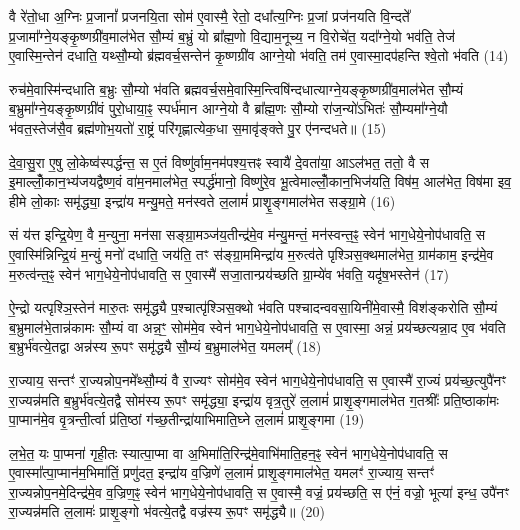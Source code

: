 वै रे॑तो॒धा अ॒ग्निः प्र॒जानां᳚ प्रजनयि॒ता सोम॑ ए॒वास्मै॒ रेतो॒ दधा᳚त्य॒ग्निः प्र॒जां प्रज॑नयति वि॒न्दते᳚ प्र॒जामा᳚ग्ने॒यङ्कृ॒ष्ण\-ग्री॑व॒माल॑भेत सौ॒म्यं ब॒भ्रुं यो ब्रा᳚ह्म॒णो वि॒द्याम॒नूच्य॒ न वि॒रोचे॑त॒ यदा᳚ग्ने॒यो भव॑ति॒ तेज॑ ए॒वास्मि॒न्तेन॑ दधाति॒ यथ्सौ॒म्यो ब्र॑ह्मवर्च॒सन्तेन॑ कृ॒ष्णग्री॑व आग्ने॒यो भ॑वति॒ तम॑ ए॒वास्मा॒दप॑हन्ति श्वे॒तो भ॑वति (14)

रुच॑मे॒वास्मि॑न्दधाति ब॒भ्रुः सौ॒म्यो भ॑वति ब्रह्मवर्च॒समे॒वास्मि॒न्त्विषि॑न्दधात्याग्ने॒यङ्कृ॒ष्णग्री॑व॒माल॑भेत सौ॒म्यं ब॒भ्रुमा᳚ग्ने॒यङ्कृ॒ष्णग्री॑वं पुरो॒धाया॒ꣴ॒ स्पर्ध॑मान आग्ने॒यो वै ब्रा᳚ह्म॒णः सौ॒म्यो रा॑ज॒न्यो॑\-ऽभितः॑ सौ॒म्यमा᳚ग्ने॒यौ भ॑वत॒स्तेज॑सै॒व ब्रह्म॑णोभ॒यतो॑ रा॒ष्ट्रं परि॑गृह्णात्येक॒धा स॒मावृ॑ङ्क्ते पु॒र ए॑नन्दधते॥ (15)

{}

दे॒वा॒सु॒रा ए॒षु लो॒केष्व॑स्पर्द्धन्त॒ स ए॒तं विष्णु॑र्वाम॒नम॑पश्य॒त्तꣴ स्वायै॑ दे॒वता॑या॒ आ\-ऽल॑भत॒ ततो॒ वै स इ॒माल्लोँ॒कान॒भ्य॑जयद्वैष्ण॒वं वा॑म॒नमाल॑भेत॒ स्पर्द्ध॑मानो॒ विष्णु॑रे॒व भू॒त्वेमाल्लोँ॒कान॒भिज॑यति॒ विष॑म॒ आल॑भेत॒ विष॑मा इव॒ हीमे लो॒काः समृ॑द्ध्या॒ इन्द्रा॑य मन्यु॒मते॒ मन॑स्वते ल॒लामं॑ प्राशॄ॒ङ्गमाल॑भेत सङ्ग्रा॒मे (16)

सं य॑त्त इन्द्रि॒येण॒ वै म॒न्युना॒ मन॑सा सङ्ग्रा॒मञ्ज॑य॒तीन्द्र॑मे॒व म॑न्यु॒मन्तं॒ मन॑स्वन्त॒ꣴ॒ स्वेन॑ भाग॒धेये॒नोप॑धावति॒ स ए॒वास्मि॑न्निन्द्रि॒यं म॒न्युं मनो॑ दधाति॒ जय॑ति॒ तꣳ स॑ङ्ग्रा॒ममिन्द्रा॑य म॒रुत्व॑ते पृश्ञिस॒क्थमाल॑भेत॒ ग्राम॑काम॒ इन्द्र॑मे॒व म॒रुत्व॑न्त॒ꣴ॒ स्वेन॑ भाग॒धेये॒नोप॑धावति॒ स ए॒वास्मै॑ सजा॒तान्प्रय॑च्छति ग्रा॒म्ये॑व भ॑वति॒ यदृ॑ष॒भस्तेन॑ (17)

ऐ॒न्द्रो यत्पृश्ञि॒स्तेन॑ मारु॒तः समृ॑द्ध्यै प॒श्चात्पृ॑श्ञिस॒क्थो भ॑वति पश्चादन्ववसा॒यिनी॑मे॒वास्मै॒ विश॑ङ्करोति सौ॒म्यं ब॒भ्रुमाल॑भे॒तान्न॑कामः सौ॒म्यं वा अन्न॒ꣳ॒ सोम॑मे॒व स्वेन॑ भाग॒धेये॒नोप॑धावति॒ स ए॒वास्मा॒ अन्नं॒ प्रय॑च्छत्यन्ना॒द ए॒व भ॑वति ब॒भ्रुर्भ॑वत्ये॒तद्वा अन्न॑स्य रू॒पꣳ समृ॑द्ध्यै सौ॒म्यं ब॒भ्रुमाल॑भेत॒ यमलम्᳚ (18)

रा॒ज्याय॒ सन्तꣳ॑ रा॒ज्यन्नोप॒नमे᳚थ्सौ॒म्यं वै रा॒ज्यꣳ सोम॑मे॒व स्वेन॑ भाग॒धेये॒नोप॑धावति॒ स ए॒वास्मै॑ रा॒ज्यं प्रय॑च्छ॒त्युपै॑नꣳ रा॒ज्यन्न॑मति ब॒भ्रुर्भ॑वत्ये॒तद्वै सोम॑स्य रू॒पꣳ समृ॑द्ध्या॒ इन्द्रा॑य वृत्र॒तुरे॑ ल॒लामं॑ प्राशृ॒ङ्गमाल॑भेत ग॒तश्रीः᳚ प्रति॒ष्ठाका॑मः पा॒प्मान॑मे॒व वृ॒त्रन्ती॒र्त्वा प्र॑ति॒ष्ठां ग॑च्छ॒तीन्द्रा॑याभिमाति॒घ्ने ल॒लामं॑ प्राशृ॒ङ्गमा (19)

ल॒भे॒त॒ यः पा॒प्मना॑ गृही॒तः स्यात्पा॒प्मा वा अ॒भिमा॑ति॒रिन्द्र॑मे॒वाभि॑माति॒हन॒ꣴ॒ स्वेन॑ भाग॒धेये॒नोप॑धावति॒ स ए॒वास्मा᳚त्पा॒प्मान॑म॒भिमा॑तिं॒ प्रणु॑दत॒ इन्द्रा॑य व॒ज्रिणे॑ ल॒लामं॑ प्राशृ॒ङ्गमाल॑भेत॒ यमलꣳ॑ रा॒ज्याय॒ सन्तꣳ॑ रा॒ज्यन्नोप॒नमे॒दिन्द्र॑मे॒व व॒ज्रिण॒ꣴ॒ स्वेन॑ भाग॒धेये॒नोप॑धावति॒ स ए॒वास्मै॒ वज्रं॒ प्रय॑च्छति॒ स ए॑नं॒ वज्रो॒ भूत्या॑ इन्ध॒ उपै॑नꣳ रा॒ज्यन्न॑मति ल॒लामः॑ प्राशृ॒ङ्गो भ॑वत्ये॒तद्वै वज्र॑स्य रू॒पꣳ समृ॑द्ध्यै॥ (20)

